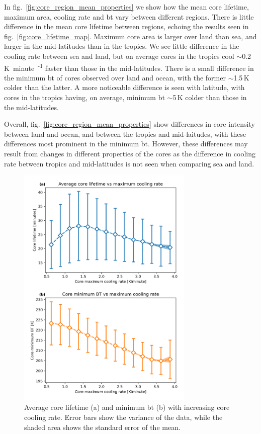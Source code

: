 In fig.~\ref{fig:core_region_mean_properties} we show how the mean core lifetime, maximum area, cooling rate and \acrshort{bt} vary between different regions.
There is little difference in the mean core lifetime between regions, echoing the results seen in fig.~\ref{fig:core_lifetime_map}.
Maximum core area is larger over land than sea, and larger in the mid-latitudes than in the tropics.
We see little difference in the cooling rate between sea and land, but on average cores in the tropics cool $\sim$0.2\,\unit{K minute\textsuperscript{-1}} faster than those in the mid-latitudes.
There is a small difference in the minimum \acrshort{bt} of cores observed over land and ocean, with the former $\sim$1.5\,\unit{K} colder than the latter.
A more noticeable difference is seen with latitude, with cores in the tropics having, on average, minimum \acrshort{bt} $\sim$5\,\unit{K} colder than those in the mid-latitudes.

Overall, fig.~\ref{fig:core_region_mean_properties} show differences in core intensity between land and ocean, and between the tropics and mid-laitudes, with these differences most prominent in the minimum \acrshort{bt}.
However, these differences may result from changes in different properties of the cores as the difference in cooling rate between tropics and mid-latitudes is not seen when comparing sea and land.

\begin{figure}[tp]
    \centering
    \includegraphics[width=0.75\textwidth]{figures/chapter2_10.png}
    \caption[
    Average core lifetime and minimum \acrshort{bt} with increasing core cooling rate
    ]{
    Average core lifetime (a) and minimum \acrshort{bt} (b) with increasing core cooling rate. Error bars show the variance of the data, while the shaded area shows the standard error of the mean.
    }
    \label{fig:core_cooling_rate_relations}
\end{figure}


